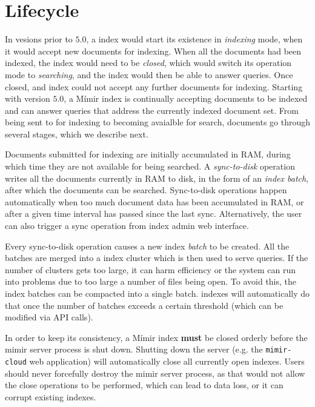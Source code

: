 \section{\Mimir{} Lifecycle}

In vesions prior to $5.0$, a \Mimir{} index would start its existence in {\em
indexing} mode, when it would accept new documents for indexing. When all the
documents had been indexed, the index would need to be {\em closed}, which would
switch its operation mode to {\em searching}, and the index would then be able
to answer queries. Once closed, and index could not accept any further documents
for indexing. Starting with version $5.0$, a Mímir index is continually
accepting documents to be indexed and can answer queries that address the
currently indexed document set. From being sent to \Mimir{} for indexing to
becoming avaialble for search, documents go through several stages, which we
describe next.

Documents submitted for indexing are initially accumulated in RAM, during
which time they are not available for being searched. A {\em sync-to-disk}
operation writes all the documents currently in RAM to disk, in the form of an
{\em index batch}, after which the documents can be searched. Sync-to-disk
operations happen automatically when too much document data has been accumulated
in RAM, or after a given time interval has passed since the last sync.
Alternatively, the user can also trigger a sync operation from index admin web
interface.

Every sync-to-disk operation causes a new index {\em batch} to be created.
All the batches are merged into a index cluster which is then used to serve
queries. If the number of clusters gets too large, it can harm efficiency or the
system can run into problems due to too large a number of files being open. To
avoid this, the index batches can be compacted into a single batch. \Mimir{}
indexes will automatically do that once the number of batches exceeds a certain
threshold (which can be modified via API calls).

In order to keep its consistency, a Mímir index {\bf must} be closed orderly
before the mimir server process is shut down. Shutting down the \Mimir{} server
(e.g. the {\tt mimir-cloud} web application) will automatically close all
currently open indexes. Users should never forcefully destroy the mimir server
process, as that would not allow the close operations to be performed, which can
lead to data loss, or it can corrupt existing indexes.
